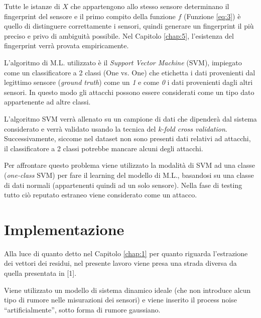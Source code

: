 \documentclass[Lau,binding=0.6cm]{sapthesis}
\begin{document}
Tutte le istanze di $X$ che appartengono allo stesso sensore determinano il fingerprint del sensore e il primo compito della funzione $f$ (Funzione \ref{eq:3}) \`e quello di distinguere correttamente i sensori, 
quindi generare un fingerprint il pi\`u preciso e privo di ambiguit\`a possibile. Nel Capitolo \ref{chap:5}, l'esistenza del fingerprint verr\`a provata empiricamente.

L'algoritmo di M.L. utilizzato \`e il \textit{Support Vector Machine} (SVM), impiegato come un classificatore a 2 classi (One vs. One) che etichetta i dati provenienti dal legittimo sensore (\textit{ground truth}) come un \textit{1}
e come \textit{0} i dati provenienti dagli altri sensori. In questo modo gli attacchi possono essere considerati come un tipo dato appartenente ad altre classi.

L'algoritmo SVM verr\`a allenato su un campione di dati che dipender\`a dal sistema considerato e verr\`a validato usando la tecnica del \textit{k-fold cross validation}.
Successivamente, siccome nel dataset non sono presenti dati relativi ad attacchi, il classificatore a 2 classi potrebbe mancare alcuni degli attacchi.

Per affrontare questo problema viene utilizzato la modalit\`a di SVM ad una classe (\textit{one-class} SVM) per fare il learning del modello di M.L., basandosi su una classe di dati normali (appartenenti quindi ad un solo sensore). 
Nella fase di testing tutto ci\`o reputato estraneo viene considerato come un attacco.


\chapter{Implementazione}\label{chap:4}
Alla luce di quanto detto nel Capitolo \ref{chap:1} per quanto riguarda l'estrazione dei vettori dei residui, nel presente lavoro viene presa una strada diversa da quella presentata in [1].

Viene utilizzato un modello di sistema dinamico ideale (che non introduce alcun tipo di rumore nelle misurazioni dei sensori) e viene inserito il process noise ``artificialmente'', sotto forma di rumore gaussiano.
\end{document}
